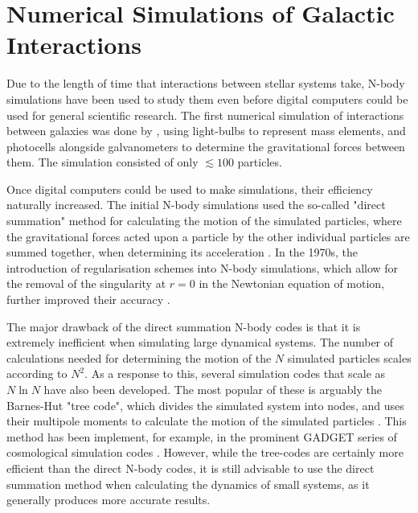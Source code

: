\documentclass[english, twoside]{HYgradu}
\begin{document}


\section{Numerical Simulations of Galactic Interactions}

Due to the length of time that interactions between stellar systems take, N-body simulations have been used to study them even before digital computers could be used for general scientific research. The first numerical  simulation of interactions between galaxies was done by \cite{Holmberg1941}, using light-bulbs to represent mass elements, and photocells alongside galvanometers to determine the gravitational forces between them. The simulation consisted of only $\lesssim 100$ particles. 

Once digital computers could be used to make simulations, their efficiency naturally increased. The initial N-body simulations used the so-called "direct summation" method for calculating the motion of the simulated particles, where the gravitational forces acted upon a particle by the other individual particles are summed together, when determining its acceleration \citep{vonHoerner1960, Aarseth1963}. In the 1970s, the introduction of regularisation schemes into N-body simulations, which allow for the removal of the singularity at $r = 0$ in the Newtonian equation of motion, further improved their accuracy \citep{Aarseth1999}.

The major drawback of the direct summation N-body codes is that it is extremely inefficient when simulating large dynamical systems. The number of calculations needed for determining the motion of the $N$ simulated particles scales according to $N^2$. As a response to this, several simulation codes that scale as $N \ln N$ have also been developed. The most popular of these is arguably the Barnes-Hut "tree code", which divides the simulated system into nodes, and uses their multipole moments to calculate the motion of the simulated particles \citep{Barnes1986}. This method has been implement, for example, in the prominent GADGET series of cosmological simulation codes \citep{Springel2001}. However, while the tree-codes are certainly more efficient than the direct N-body codes, it is still advisable to use the direct summation method when calculating the dynamics of small systems, as it generally produces more accurate results.
\end{document}
